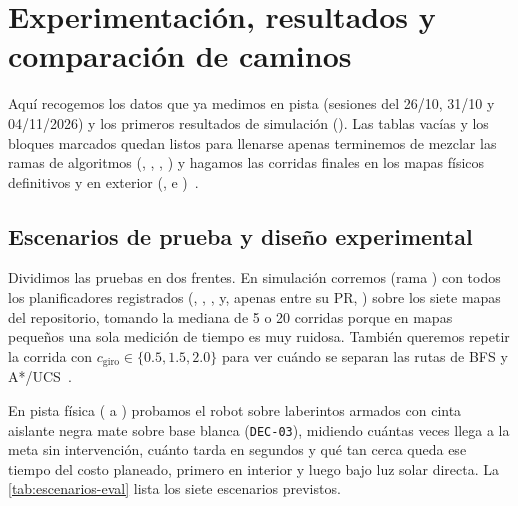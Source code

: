 \section{Experimentación, resultados y comparación de caminos}
\label{sec:resultados}

\begin{porcompletar}
  Aquí recogemos los datos que ya medimos en pista (sesiones del 26/10, 31/10 y 04/11/2026) y los primeros resultados de simulación (). Las tablas vacías y los bloques marcados quedan listos para llenarse apenas terminemos de mezclar las ramas de algoritmos (, , , ) y hagamos las corridas finales en los mapas físicos definitivos y en exterior (,  e )~\cite{excel2026organizacion}.
\end{porcompletar}

\subsection{Escenarios de prueba y diseño experimental}
\label{subsec:escenarios}

Dividimos las pruebas en dos frentes. En simulación corremos  (rama ) con todos los planificadores registrados (, , ,  y, apenas entre su PR, ) sobre los siete mapas del repositorio, tomando la mediana de 5 o 20 corridas porque en mapas pequeños una sola medición de tiempo es muy ruidosa. También queremos repetir la corrida con $c_{\text{giro}} \in \{0.5, 1.5, 2.0\}$ para ver cuándo se separan las rutas de BFS y A*/UCS~\cite{handoff2026doc}.

En pista física ( a ) probamos el robot sobre laberintos armados con cinta aislante negra mate sobre base blanca (\texttt{DEC-03}), midiendo cuántas veces llega a la meta sin intervención, cuánto tarda en segundos y qué tan cerca queda ese tiempo del costo planeado, primero en interior y luego bajo luz solar directa. La \cref{tab:escenarios-eval} lista los siete escenarios previstos.

